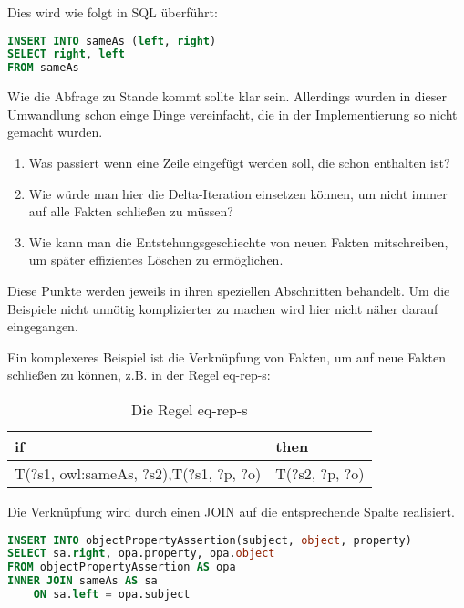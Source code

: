 Dies wird wie folgt in SQL überführt:
\begin{lstlisting}[language=SQL]
INSERT INTO sameAs (left, right)
SELECT right, left
FROM sameAs
\end{lstlisting}

Wie die Abfrage zu Stande kommt sollte klar sein. Allerdings wurden in dieser Umwandlung schon einge Dinge vereinfacht, die in der Implementierung so nicht gemacht wurden.

\begin{enumerate}
  \item Was passiert wenn eine Zeile eingefügt werden soll, die schon enthalten ist?
  \item Wie würde man hier die Delta-Iteration einsetzen können, um nicht immer auf alle Fakten schließen zu müssen?
  \item Wie kann man die Entstehungsgeschiechte von neuen Fakten mitschreiben, um später effizientes Löschen zu ermöglichen.
\end{enumerate}

Diese Punkte werden jeweils in ihren speziellen Abschnitten behandelt. Um die Beispiele nicht unnötig komplizierter zu machen wird hier nicht näher darauf eingegangen.

Ein komplexeres Beispiel ist die Verknüpfung von Fakten, um auf neue Fakten schließen zu können, z.B. in der Regel eq-rep-s:
\begin{table}[htb]
\begin{center}
	\begin{tabular}{m{4.5cm}|m{4cm}}
	if & then \\ \hline
	T(?s1, owl:sameAs, ?s2),\newline T(?s1, ?p, ?o) & T(?s2, ?p, ?o)
	\end{tabular}
\end{center}
	\caption{Die Regel eq-rep-s}
	\label{rule-eq-rep-s}
\end{table}

Die Verknüpfung wird durch einen JOIN auf die entsprechende Spalte realisiert.

\begin{lstlisting}[language=SQL]
INSERT INTO objectPropertyAssertion(subject, object, property)
SELECT sa.right, opa.property, opa.object
FROM objectPropertyAssertion AS opa
INNER JOIN sameAs AS sa
	ON sa.left = opa.subject
\end{lstlisting}

